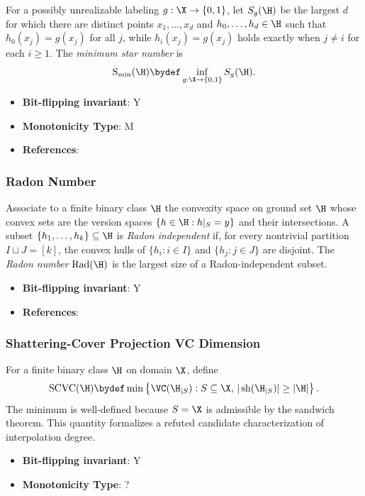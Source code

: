       \begin{definition}\label{def:minimum_star_number}
      For a possibly unrealizable labeling $g:\X\to\{0,1\}$, let $S_g(\H)$ be the largest $d$ for which there are distinct points $x_1,\ldots,x_d$ and $h_0,\ldots,h_d\in\H$ such that $h_0(x_j)=g(x_j)$ for all $j$, while $h_i(x_j)=g(x_j)$ holds exactly when $j\ne i$ for each $i\ge1$.  The \emph{minimum star number} is
      \[
      \mathrm{S}_{\mathrm{min}}(\H)\bydef\inf_{g:\X\to\{0,1\}}S_g(\H).
      \]
      \end{definition}
      \begin{itemize}
      \item {\bf Bit-flipping invariant}: Y
      \item {\bf Monotonicity Type}: M
      \item {\bf References}: \cite{hanneke2024star_eluder}
      \end{itemize}
\subsubsection{Radon Number}

      \begin{definition}\label{def:radon_number}
      Associate to a finite binary class $\H$ the convexity space on ground set $\H$ whose convex sets are the version spaces $\{h\in\H:h|_S=y\}$ and their intersections.  A subset $\{h_1,\ldots,h_k\}\subseteq\H$ is \emph{Radon independent} if, for every nontrivial partition $I\sqcup J=[k]$, the convex hulls of $\{h_i:i\in I\}$ and $\{h_j:j\in J\}$ are disjoint.  The \emph{Radon number} $\mathrm{Rad}(\H)$ is the largest size of a Radon-independent subset.
      \end{definition}
      \begin{itemize}
      \item {\bf Bit-flipping invariant}: Y
      \item {\bf References}: \cite{chase2024dual}
      \end{itemize}
\subsubsection{Shattering-Cover Projection VC Dimension}
      \begin{definition}\label{def:shattering_cover_projection_vc_dimension}
      For a finite binary class $\H$ on domain $\X$, define
      \[
      \mathrm{SCVC}(\H)\bydef
      \min\left\{\VC(\H_{|S}):S\subseteq\X,\,
      |\operatorname{sh}(\H_{|S})|\geq|\H|\right\}.
      \]
      The minimum is well-defined because $S=\X$ is admissible by the
      sandwich theorem.  This quantity formalizes a refuted candidate
      characterization of interpolation degree.
      \end{definition}
      \begin{itemize}
      \item {\bf Bit-flipping invariant}: Y
      \item {\bf Monotonicity Type}: ?
      \end{itemize}

